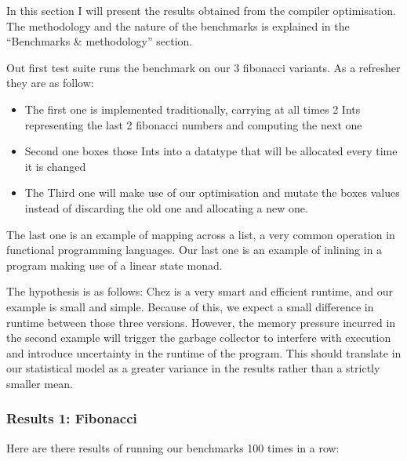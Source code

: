 \documentclass[
]{article}
\providecommand{\tightlist}{%
  \setlength{\itemsep}{0pt}\setlength{\parskip}{0pt}}
\begin{document}
In this section I will present the results obtained from the compiler
optimisation. The methodology and the nature of the benchmarks is
explained in the ``Benchmarks \& methodology'' section.

Out first test suite runs the benchmark on our 3 fibonacci variants. As
a refresher they are as follow:

\begin{itemize}
\tightlist
\item
  The first one is implemented traditionally, carrying at all times 2
  Ints representing the last 2 fibonacci numbers and computing the next
  one
\item
  Second one boxes those Ints into a datatype that will be allocated
  every time it is changed
\item
  The Third one will make use of our optimisation and mutate the boxes
  values instead of discarding the old one and allocating a new one.
\end{itemize}

The last one is an example of mapping across a list, a very common
operation in functional programming languages. Our last one is an
example of inlining in a program making use of a linear state monad.

The hypothesis is as follows: Chez is a very smart and efficient
runtime, and our example is small and simple. Because of this, we expect
a small difference in runtime between those three versions. However, the
memory pressure incurred in the second example will trigger the garbage
collector to interfere with execution and introduce uncertainty in the
runtime of the program. This should translate in our statistical model
as a greater variance in the results rather than a strictly smaller
mean.

\hypertarget{results-1-fibonacci}{%
\subsubsection{Results 1: Fibonacci}\label{results-1-fibonacci}}

Here are there results of running our benchmarks 100 times in a row:
\end{document}
